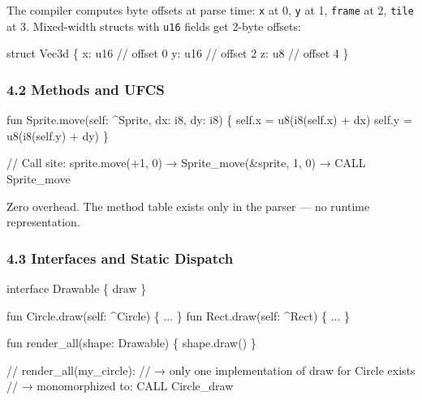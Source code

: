 \documentclass[
  11pt,
]{article}
\newenvironment{Shaded}{}{}
\newcommand{\NormalTok}[1]{#1}
\begin{document}
The compiler computes byte offsets at parse time: \texttt{x} at 0,
\texttt{y} at 1, \texttt{frame} at 2, \texttt{tile} at 3. Mixed-width
structs with \texttt{u16} fields get 2-byte offsets:

\begin{Shaded}
\begin{Highlighting}[]
\NormalTok{struct Vec3d \{}
\NormalTok{    x: u16   // offset 0}
\NormalTok{    y: u16   // offset 2}
\NormalTok{    z: u8    // offset 4}
\NormalTok{\}}
\end{Highlighting}
\end{Shaded}

\subsubsection{4.2 Methods and UFCS}\label{methods-and-ufcs}

\begin{Shaded}
\begin{Highlighting}[]
\NormalTok{fun Sprite.move(self: \^{}Sprite, dx: i8, dy: i8) \{}
\NormalTok{    self.x = u8(i8(self.x) + dx)}
\NormalTok{    self.y = u8(i8(self.y) + dy)}
\NormalTok{\}}

\NormalTok{// Call site:}
\NormalTok{sprite.move(+1, 0)   →   Sprite\_move(\&sprite, 1, 0)   →   CALL Sprite\_move}
\end{Highlighting}
\end{Shaded}

Zero overhead. The method table exists only in the parser --- no runtime
representation.

\subsubsection{4.3 Interfaces and Static
Dispatch}\label{interfaces-and-static-dispatch}

\begin{Shaded}
\begin{Highlighting}[]
\NormalTok{interface Drawable \{}
\NormalTok{    draw}
\NormalTok{\}}

\NormalTok{fun Circle.draw(self: \^{}Circle) \{ ... \}}
\NormalTok{fun Rect.draw(self: \^{}Rect) \{ ... \}}

\NormalTok{fun render\_all(shape: Drawable) \{}
\NormalTok{    shape.draw()}
\NormalTok{\}}

\NormalTok{// render\_all(my\_circle):}
\NormalTok{//   → only one implementation of \textquotesingle{}draw\textquotesingle{} for Circle exists}
\NormalTok{//   → monomorphized to: CALL Circle\_draw}
\end{Highlighting}
\end{Shaded}
\end{document}
